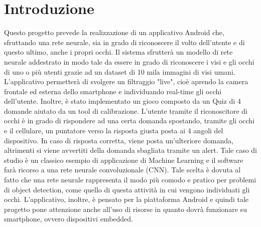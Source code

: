 \documentclass[11pt]{article}
\begin{document}
\clearpage
\null
\thispagestyle{empty}
\clearpage

\newpage







\cleardoublepage



\newpage

\tableofcontents


\newpage


\listoffigures



\newpage


\newpage
\fancyfoot[L]{\thepage}
\setcounter{page}{1}
\section{Introduzione}
Questo progetto prevede la realizzazione di un applicativo Android che, sfruttando una rete neurale, sia in grado di riconoscere il volto dell’utente e di questo ultimo, anche i propri occhi. Il sistema sfrutterà un modello di rete neurale
addestrato in modo tale da essere in grado di riconoscere i visi e gli occhi di uno o più utenti grazie ad un dataset di 10 mila immagini di visi umani.
L’applicativo permetterà di svolgere un filtraggio "live", cioè aprendo la camera frontale ed esterna dello smartphone e individuando real-time gli occhi dell’utente.
\newline
Inoltre, è stato implementato un gioco composto da un Quiz di 4 domande aiutato da un tool di calibrazione. L'utente tramite il riconoscitore di occhi è in grado di rispondere ad una certa domanda spostando, tramite gli occhi e il cellulare, un puntatore verso la risposta giusta posta ai 4 angoli del dispositivo. In caso di risposta corretta, viene posta un'ulteriore domanda, altrimenti si viene avvertiti della domanda sbagliata tramite un alert.
\newline \newline
Tale caso di studio è un classico esempio di applicazione di Machine Learning e il software farà ricorso a una rete neurale convoluzionale (CNN). Tale scelta è dovuta al fatto che una rete neurale rappresenta il modo più comodo e pratico per problemi di object detection, come quello di questa attività in cui vengono individuati gli occhi.
\newline \newline
L’applicativo, inoltre, è pensato per la piattaforma Android e quindi tale progetto pone attenzione anche all’uso di risorse in quanto dovrà funzionare su smartphone, ovvero dispositivi embedded.
\end{document}
